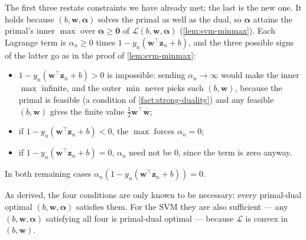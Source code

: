 The first three restate constraints we have already met; the last is the
new one. It holds because \((b, \bm{w}, \bm{\alpha})\) solves the primal as
well as the dual, so \(\bm{\alpha}\) attains the primal's inner \(\max\)
over \(\bm{\alpha} \ge \bm{0}\) of \(\mathcal{L}(b, \bm{w}, \bm{\alpha})\)
(\autoref{lem:svm-minmax}). Each Lagrange term is
\(\alpha_n \ge 0\) times \(1 - y_n (\bm{w}^\top \bm{z}_n + b)\), and the
three possible signs of the latter go as in the proof of
\autoref{lem:svm-minmax}:
\begin{itemize}
    \item \(1 - y_n (\bm{w}^\top \bm{z}_n + b) > 0\) is impossible: sending
        \(\alpha_n \to \infty\) would make the inner \(\max\) infinite, and
        the outer \(\min\) never picks such \((b, \bm{w})\), because the
        primal is feasible (a condition of \autoref{fact:strong-duality}) and
        any feasible \((b, \bm{w})\) gives the finite value \(\frac{1}{2}
        \bm{w}^\top \bm{w}\);
    \item if \(1 - y_n (\bm{w}^\top \bm{z}_n + b) < 0\), the \(\max\) forces
        \(\alpha_n = 0\);
    \item if \(1 - y_n (\bm{w}^\top \bm{z}_n + b) = 0\), \(\alpha_n\) need
        not be \(0\), since the term is zero anyway.
\end{itemize}
In both remaining cases \(\alpha_n (1 - y_n (\bm{w}^\top \bm{z}_n + b)) = 0\).

As derived, the four conditions are only known to be necessary: every
primal-dual optimal \((b, \bm{w}, \bm{\alpha})\) satisfies them. For the SVM
they are also sufficient --- any \((b, \bm{w}, \bm{\alpha})\) satisfying all
four is primal-dual optimal --- because \(\mathcal{L}\) is convex in \((b,
\bm{w})\).

